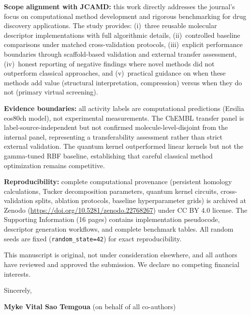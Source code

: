 \documentclass[9pt,a4paper]{article}
\begin{document}
\noindent\textbf{Scope alignment with JCAMD:} this work directly addresses the journal's focus on computational method development and rigorous benchmarking for drug discovery applications. The study provides: (i)~three reusable molecular descriptor implementations with full algorithmic details, (ii)~controlled baseline comparisons under matched cross-validation protocols, (iii)~explicit performance boundaries through scaffold-based validation and external transfer assessment, (iv)~honest reporting of negative findings where novel methods did not outperform classical approaches, and (v)~practical guidance on when these methods add value (structural interpretation, compression) versus when they do not (primary virtual screening).

\noindent\textbf{Evidence boundaries:} all activity labels are computational predictions (Ersilia eos80ch model), not experimental measurements. The ChEMBL transfer panel is label-source-independent but not confirmed molecule-level-disjoint from the internal panel, representing a transferability assessment rather than strict external validation. The quantum kernel outperformed linear kernels but not the gamma-tuned RBF baseline, establishing that careful classical method optimization remains competitive.

\noindent\textbf{Reproducibility:} complete computational provenance (persistent homology calculations, Tucker decomposition parameters, quantum kernel circuits, cross-validation splits, ablation protocols, baseline hyperparameter grids) is archived at Zenodo (\url{https://doi.org/10.5281/zenodo.22768267}) under CC BY 4.0 license. The Supporting Information (\num{16} pages) contains implementation pseudocode, descriptor generation workflows, and complete benchmark tables. All random seeds are fixed (\texttt{random\_state=42}) for exact reproducibility.

This manuscript is original, not under consideration elsewhere, and all authors have reviewed and approved the submission. We declare no competing financial interests.

\vspace{0.3em}

\noindent Sincerely,

\noindent \textbf{Myke Vital Sao Temgoua} (on behalf of all co-authors)
\end{document}
